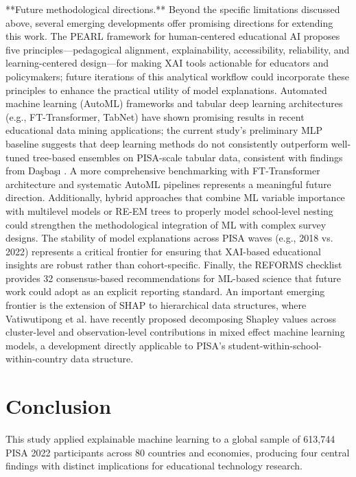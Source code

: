 \documentclass[pdflatex,sn-mathphys-ay]{sn-jnl}
\begin{document}
**Future methodological directions.** Beyond the specific limitations discussed above, several emerging developments offer promising directions for extending this work. The PEARL framework for human-centered educational AI \citep{PEARL_2026} proposes five principles---pedagogical alignment, explainability, accessibility, reliability, and learning-centered design---for making XAI tools actionable for educators and policymakers; future iterations of this analytical workflow could incorporate these principles to enhance the practical utility of model explanations. Automated machine learning (AutoML) frameworks and tabular deep learning architectures (e.g., FT-Transformer, TabNet) have shown promising results in recent educational data mining applications; the current study's preliminary MLP baseline suggests that deep learning methods do not consistently outperform well-tuned tree-based ensembles on PISA-scale tabular data, consistent with findings from Daşbaşı \citep{Dasbasi_2025_dynamic}. A more comprehensive benchmarking with FT-Transformer architecture and systematic AutoML pipelines represents a meaningful future direction. Additionally, hybrid approaches that combine ML variable importance with multilevel models \citep{Soares_2024_brazil} or RE-EM trees \citep{Liu_2024_REEM} to properly model school-level nesting could strengthen the methodological integration of ML with complex survey designs. The stability of model explanations across PISA waves (e.g., 2018 vs. 2022) \citep{Tiukhova_2025_stability} represents a critical frontier for ensuring that XAI-based educational insights are robust rather than cohort-specific. Finally, the REFORMS checklist \citep{Kapoor_2024_REFORMS} provides 32 consensus-based recommendations for ML-based science that future work could adopt as an explicit reporting standard. An important emerging frontier is the extension of SHAP to hierarchical data structures, where Vatiwutipong et al. \citep{Vatiwutipong_2026_mixed_effect_shap} have recently proposed decomposing Shapley values across cluster-level and observation-level contributions in mixed effect machine learning models, a development directly applicable to PISA's student-within-school-within-country data structure.

\section{Conclusion}

This study applied explainable machine learning to a global sample of 613,744 PISA 2022 participants across 80 countries and economies, producing four central findings with distinct implications for educational technology research.
\end{document}

